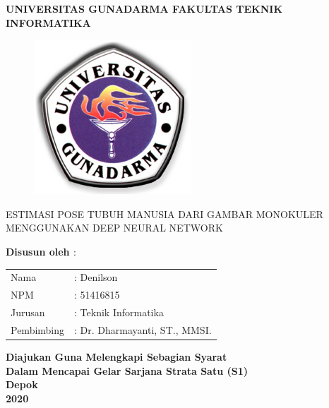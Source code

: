 \newpage


\begin{center}

\bfseries
 {\Huge UNIVERSITAS GUNADARMA}
 \vspace{1.0cm}
 {\Large FAKULTAS TEKNIK INFORMATIKA}%
\vspace{0.2cm}

\begin{figure}[h]
  \begin{center}
    \includegraphics[scale=4]{gambar/LogoGunadarma.jpg}
  \end{center}
\end{figure}
 
{\large ESTIMASI POSE TUBUH MANUSIA DARI GAMBAR MONOKULER MENGGUNAKAN DEEP NEURAL NETWORK}

\end{center}
\vspace{0.5cm}

\begin{center}
\bfseries
{Disusun oleh $:$}

\vspace{0.5cm}

\begin{tabular}{ll}
Nama& : Denilson\tabularnewline 
NPM& : 51416815\tabularnewline 
Jurusan& : Teknik Informatika\tabularnewline
Pembimbing& : Dr. Dharmayanti, ST., MMSI.\tabularnewline
\end{tabular}
\end{center}

\vspace{2.0cm}
\begin{center}
\bfseries
Diajukan Guna Melengkapi Sebagian Syarat \\
Dalam Mencapai Gelar Sarjana Strata Satu (S1)\\

Depok\\
2020 %

\end{center}
